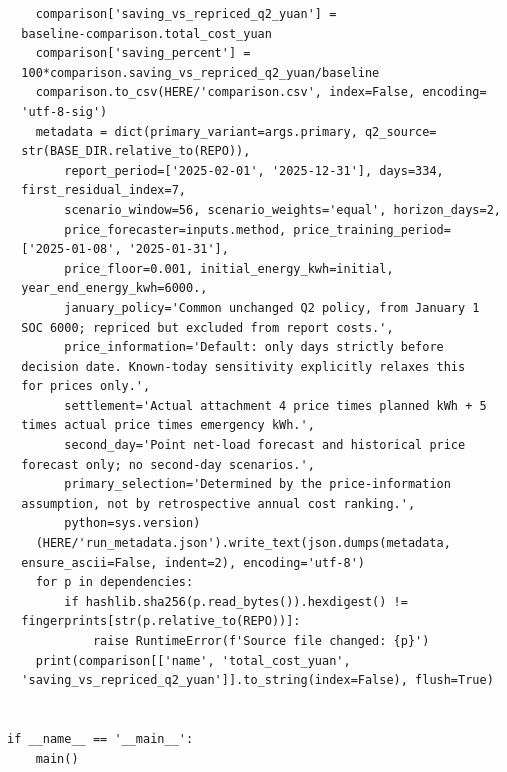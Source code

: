 \begin{verbatim}
    comparison['saving_vs_repriced_q2_yuan'] =
  baseline-comparison.total_cost_yuan
    comparison['saving_percent'] =
  100*comparison.saving_vs_repriced_q2_yuan/baseline
    comparison.to_csv(HERE/'comparison.csv', index=False, encoding=
  'utf-8-sig')
    metadata = dict(primary_variant=args.primary, q2_source=
  str(BASE_DIR.relative_to(REPO)),
        report_period=['2025-02-01', '2025-12-31'], days=334,
  first_residual_index=7,
        scenario_window=56, scenario_weights='equal', horizon_days=2,
        price_forecaster=inputs.method, price_training_period=
  ['2025-01-08', '2025-01-31'],
        price_floor=0.001, initial_energy_kwh=initial,
  year_end_energy_kwh=6000.,
        january_policy='Common unchanged Q2 policy, from January 1
  SOC 6000; repriced but excluded from report costs.',
        price_information='Default: only days strictly before
  decision date. Known-today sensitivity explicitly relaxes this
  for prices only.',
        settlement='Actual attachment 4 price times planned kWh + 5
  times actual price times emergency kWh.',
        second_day='Point net-load forecast and historical price
  forecast only; no second-day scenarios.',
        primary_selection='Determined by the price-information
  assumption, not by retrospective annual cost ranking.',
        python=sys.version)
    (HERE/'run_metadata.json').write_text(json.dumps(metadata,
  ensure_ascii=False, indent=2), encoding='utf-8')
    for p in dependencies:
        if hashlib.sha256(p.read_bytes()).hexdigest() !=
  fingerprints[str(p.relative_to(REPO))]:
            raise RuntimeError(f'Source file changed: {p}')
    print(comparison[['name', 'total_cost_yuan',
  'saving_vs_repriced_q2_yuan']].to_string(index=False), flush=True)


if __name__ == '__main__':
    main()
\end{verbatim}

